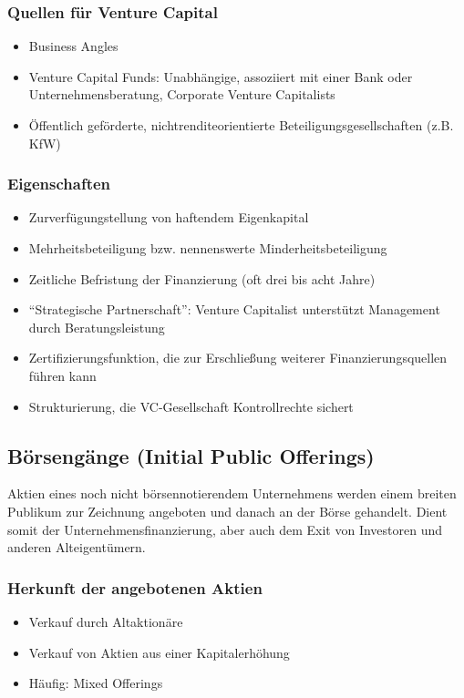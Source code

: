 \subsubsection{Quellen für Venture Capital}
\begin{itemize}
	\item Business Angles
	\item Venture Capital Funds: Unabhängige, assoziiert mit einer Bank oder Unternehmensberatung, Corporate Venture Capitalists
	\item Öffentlich geförderte, nichtrenditeorientierte Beteiligungsgesellschaften (z.B. KfW)
\end{itemize}

\subsubsection{Eigenschaften}
\begin{itemize}
	\item Zurverfügungstellung von haftendem Eigenkapital
	\item Mehrheitsbeteiligung bzw. nennenswerte Minderheitsbeteiligung
	\item Zeitliche Befristung der Finanzierung (oft drei bis acht Jahre)
	\item "`Strategische Partnerschaft"': Venture Capitalist unterstützt Management durch Beratungsleistung
	\item Zertifizierungsfunktion, die zur Erschließung weiterer Finanzierungsquellen führen kann
	\item Strukturierung, die VC-Gesellschaft Kontrollrechte sichert
\end{itemize}


\subsection{Börsengänge (Initial Public Offerings)}
Aktien eines noch nicht börsennotierendem Unternehmens werden einem breiten Publikum zur Zeichnung angeboten und danach an der Börse gehandelt. Dient somit der Unternehmensfinanzierung, aber auch dem Exit von Investoren und anderen Alteigentümern.

\subsubsection{Herkunft der angebotenen Aktien}
\begin{itemize}
	\item Verkauf durch Altaktionäre
	\item Verkauf von Aktien aus einer Kapitalerhöhung
	\item Häufig: Mixed Offerings
\end{itemize}


